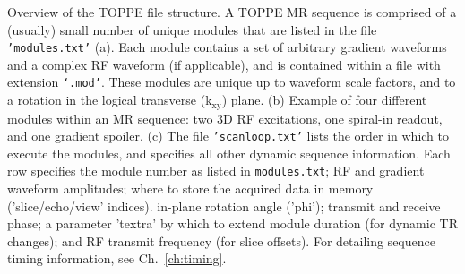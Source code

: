 {
Overview of the TOPPE file structure.
A TOPPE MR sequence is comprised of a (usually) small number of unique modules that are listed in the file \texttt{'modules.txt'} (a).
Each module contains a set of arbitrary gradient waveforms and a complex RF waveform (if applicable), and is contained within a file with extension \texttt{`.mod'}.
These modules are unique up to waveform scale factors, and to a rotation in the logical transverse (k$_\textrm{xy}$) plane.
(b) Example of four different modules within an MR sequence: two 3D RF excitations, one spiral-in readout, and one gradient spoiler.
(c) The file \texttt{'scanloop.txt'} lists the order in which to execute the modules, and specifies all other dynamic sequence information.
Each row specifies the module number as listed in \texttt{modules.txt}; RF and gradient waveform amplitudes;
where to store the acquired data in memory ('slice/echo/view' indices).
in-plane rotation angle ('phi');
transmit and receive phase;
a parameter 'textra' by which to extend module duration (for dynamic TR changes);
and RF transmit frequency (for slice offsets).
For detailing sequence timing information, see Ch.~\ref{ch:timing}.
}

